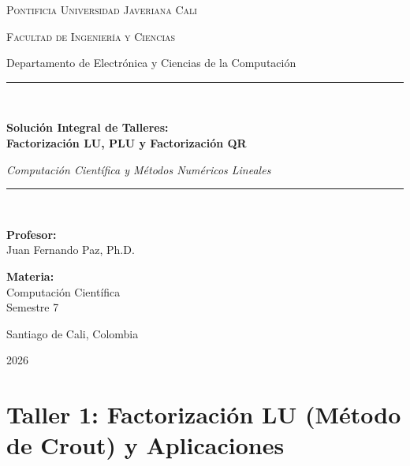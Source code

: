 \documentclass[11pt,a4paper]{article}
\theoremstyle{definition}
\theoremstyle{remark}
\begin{document}
\begin{titlepage}
    \centering
    \vspace*{1cm}
    {\scshape\LARGE Pontificia Universidad Javeriana Cali \par}
    \vspace{0.4cm}
    {\scshape\Large Facultad de Ingeniería y Ciencias \par}
    {\large Departamento de Electrónica y Ciencias de la Computación \par}
    \vspace{1.5cm}
    
    \rule{\linewidth}{1.5pt} \\[0.4cm]
    {\huge\bfseries\color{pujblue} Solución Integral de Talleres: \\[0.2cm] 
    Factorización LU, PLU y Factorización QR \par}
    \vspace{0.2cm}
    {\Large\itshape Computación Científica y Métodos Numéricos Lineales \par}
    \rule{\linewidth}{1.5pt} \\[1.5cm]
    
    \begin{minipage}[t]{0.48\textwidth}
        \large
        \textbf{Profesor:}\\
        Juan Fernando Paz, Ph.D.
    \end{minipage}
    \hfill
    \begin{minipage}[t]{0.48\textwidth}
        \begin{flushright}
            \large
            \textbf{Materia:}\\
            Computación Científica\\
            Semestre 7
        \end{flushright}
    \end{minipage}
    
    \vfill
    {\large Santiago de Cali, Colombia \par}
    {\large 2026 \par}
\end{titlepage}

\tableofcontents
\newpage

\section{Taller 1: Factorización LU (Método de Crout) y Aplicaciones}
\end{document}
